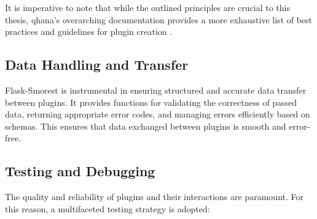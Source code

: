 \documentclass[
  a4paper,  %
  twoside,  %
  bibliography=totoc,
  headsepline,
  cleardoublepage=empty,
  parskip=half,
  draft=false
]{scrbook}
\begin{document}
It is imperative to note that while the outlined principles are crucial to this thesis, \gls{qhana}'s overarching documentation provides a more exhaustive list of best practices and guidelines for plugin creation \cite{FabianBuehler}.


\subsection{Data Handling and Transfer}
Flask-Smorest is instrumental in ensuring structured and accurate data transfer between plugins.
It provides functions for validating the correctness of passed data, returning appropriate error codes, and managing errors efficiently based on schemas.
This ensures that data exchanged between plugins is smooth and error-free.

\subsection{Testing and Debugging}

The quality and reliability of plugins and their interactions are paramount.
For this reason, a multifaceted testing strategy is adopted:
\end{document}
